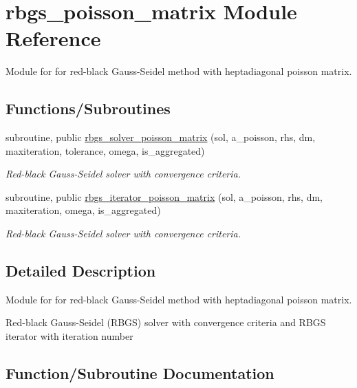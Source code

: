 \hypertarget{namespacerbgs__poisson__matrix}{}\section{rbgs\+\_\+poisson\+\_\+matrix Module Reference}
\label{namespacerbgs__poisson__matrix}


Module for for red-\/black Gauss-\/\+Seidel method with heptadiagonal poisson matrix.  


\subsection*{Functions/\+Subroutines}
\begin{DoxyCompactItemize}
\item 
subroutine, public \hyperlink{namespacerbgs__poisson__matrix_a4706c96056deda74122016f5c07ba337}{rbgs\+\_\+solver\+\_\+poisson\+\_\+matrix} (sol, a\+\_\+poisson, rhs, dm, maxiteration, tolerance, omega, is\+\_\+aggregated)
\begin{DoxyCompactList}\small\item\em Red-\/black Gauss-\/\+Seidel solver with convergence criteria. \end{DoxyCompactList}\item 
subroutine, public \hyperlink{namespacerbgs__poisson__matrix_a35a0647dd0b1e09cb482bde7fba2be91}{rbgs\+\_\+iterator\+\_\+poisson\+\_\+matrix} (sol, a\+\_\+poisson, rhs, dm, maxiteration, omega, is\+\_\+aggregated)
\begin{DoxyCompactList}\small\item\em Red-\/black Gauss-\/\+Seidel solver with convergence criteria. \end{DoxyCompactList}\end{DoxyCompactItemize}


\subsection{Detailed Description}
Module for for red-\/black Gauss-\/\+Seidel method with heptadiagonal poisson matrix. 

Red-\/black Gauss-\/\+Seidel (R\+B\+GS) solver with convergence criteria and R\+B\+GS iterator with iteration number 

\subsection{Function/\+Subroutine Documentation}
\mbox{\label{namespacerbgs__poisson__matrix_a35a0647dd0b1e09cb482bde7fba2be91}} 
